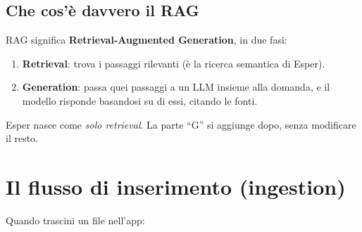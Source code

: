 \documentclass[11pt,a4paper]{article}
\begin{document}
\subsection{Che cos'è davvero il RAG}

RAG significa \textbf{Retrieval-Augmented Generation}, in due fasi:
\begin{enumerate}
  \item \textbf{Retrieval}: trova i passaggi rilevanti (è la ricerca semantica di Esper).
  \item \textbf{Generation}: passa quei passaggi a un LLM insieme alla domanda, e il modello risponde basandosi su di essi, citando le fonti.
\end{enumerate}

\begin{idea}
Esper nasce come \emph{solo retrieval}. La parte ``G'' si aggiunge dopo, senza modificare il resto.
\end{idea}

\section{Il flusso di inserimento (ingestion)}

Quando trascini un file nell'app:

\begin{center}
\end{center}
\end{document}
